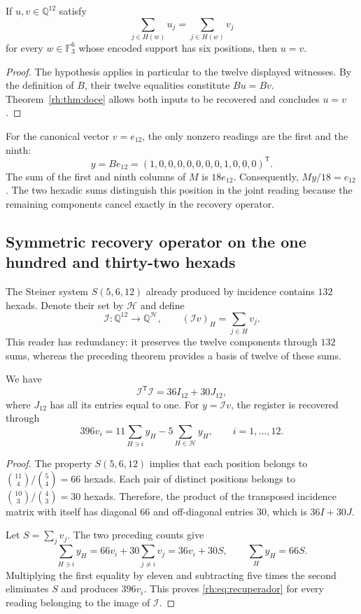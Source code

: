\begin{corollary}
If $u,v\in\mathbb Q^{12}$ satisfy
\[
\sum_{j\in H(w)}u_j=\sum_{j\in H(w)}v_j
\]
for every $w\in\mathbb F_3^6$ whose encoded support has six
positions, then $u=v$.
\end{corollary}
\begin{proof}
The hypothesis applies in particular to the twelve displayed witnesses.
By the definition of $B$, their twelve equalities constitute $Bu=Bv$.
Theorem~\ref{rh:thm:doce} allows both inputs to be recovered and
concludes $u=v$.
\end{proof}

\begin{example}
For the canonical vector $v=e_{12}$, the only nonzero readings are
the first and the ninth:
\[
y=Be_{12}=(1,0,0,0,0,0,0,0,1,0,0,0)^{\mathsf T}.
\]
The sum of the first and ninth columns of $M$ is $18e_{12}$.
Consequently, $My/18=e_{12}$. The two hexadic sums distinguish
this position in the joint reading because the remaining components
cancel exactly in the recovery operator.
\end{example}

\subsection{Symmetric recovery operator on the one hundred and thirty-two hexads}

The Steiner system $S(5,6,12)$ already produced by incidence
contains $132$ hexads. Denote their set by $\mathcal H$ and
define
\[
\mathcal I:\mathbb Q^{12}\longrightarrow\mathbb Q^{\mathcal H},
\qquad
(\mathcal I v)_H=\sum_{j\in H}v_j.
\]
This reader has redundancy: it preserves the twelve components through
$132$ sums, whereas the preceding theorem provides a basis of
twelve of these sums.

\begin{theorem}
\label{rh:thm:steiner}
We have
\[
\mathcal I^{\mathsf T}\mathcal I=36I_{12}+30J_{12},
\]
where $J_{12}$ has all its entries equal to one. For
$y=\mathcal I v$, the register is recovered through
\begin{equation}
396v_i=11\sum_{H\ni i}y_H-5\sum_{H\in\mathcal H}y_H,
\qquad i=1,\ldots,12.
\label{rh:eq:recuperador}
\end{equation}
\end{theorem}
\begin{proof}
The property $S(5,6,12)$ implies that each position belongs to
$\binom{11}{4}/\binom{5}{4}=66$ hexads. Each pair of distinct
positions belongs to $\binom{10}{3}/\binom{4}{3}=30$ hexads.
Therefore, the product of the transposed incidence matrix with
itself has diagonal $66$ and off-diagonal entries $30$, which
is $36I+30J$.

Let $S=\sum_jv_j$. The two preceding counts give
\[
\sum_{H\ni i}y_H=66v_i+30\sum_{j\ne i}v_j=36v_i+30S,
\qquad
\sum_Hy_H=66S.
\]
Multiplying the first equality by eleven and subtracting five times the
second eliminates $S$ and produces $396v_i$. This proves
\eqref{rh:eq:recuperador} for every reading belonging to the
image of $\mathcal I$.
\end{proof}

